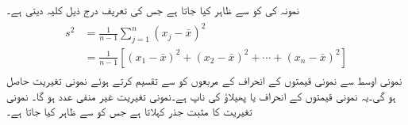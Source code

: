 نمونہ  کی  کو  سے ظاہر کیا جاتا ہے جس کی تعریف درج ذیل کلیہ دیتی ہے۔
\begin{gather}
\begin{aligned}\label{مساوات_شماریات_نمونی_اوسط_ب}
s^2&=\frac{1}{n-1}\sum_{j=1}^{n}(x_j-\bar{x})^2\\
&=\frac{1}{n-1}[(x_1-\bar{x})^2+(x_2-\bar{x})^2+\cdots +(x_n-\bar{x})^2]
\end{aligned}
\end{gather}
نمونی اوسط  سے نمونی قیمتوں کے انحراف کے مربعوں کو  سے تقسیم کرتے ہوئے نمونی تغیریت حاصل ہو گی۔یہ نمونی قیمتوں کے انحراف یا پھیلاؤ کی ناپ ہے۔نمونی تغیریت غیر منفی عدد ہو گا۔ نمونی تغیریت  کا مثبت جذر  کہلاتا ہے جس کو  سے ظاہر کیا جاتا ہے۔

